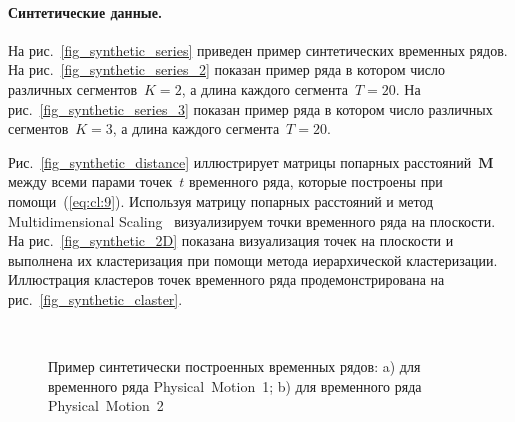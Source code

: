 \paragraph{Синтетические данные.}


На рис.~\ref{fig_synthetic_series} приведен пример синтетических временных рядов. 
На рис.~\ref{fig_synthetic_series_2} показан пример ряда в котором число различных сегментов~$K = 2$, а длина каждого сегмента~$T = 20$. 
На рис.~\ref{fig_synthetic_series_3} показан пример ряда в котором число различных сегментов~$K = 3$, а длина каждого сегмента~$T = 20$. 

Рис.~\ref{fig_synthetic_distance} иллюстрирует матрицы попарных расстояний~$\textbf{M}$ между всеми парами точек~$t$ временного ряда, которые построены при помощи~(\ref{eq:cl:9}). 
Используя матрицу попарных расстояний и метод Multidimensional Scaling~\cite{Borg2005} визуализируем точки временного ряда на плоскости. 
На рис.~\ref{fig_synthetic_2D} показана визуализация точек на плоскости и выполнена их кластеризация при помощи метода иерархической кластеризации. 
Иллюстрация кластеров точек временного ряда продемонстрирована на рис.~\ref{fig_synthetic_claster}.

\begin{figure}[h!t]\center
{}
\\
\caption{Пример синтетически построенных временных рядов: a) для временного ряда Physical~Motion~1; b) для временного ряда Physical~Motion~2}
\label{fig_real_series}
\end{figure}

